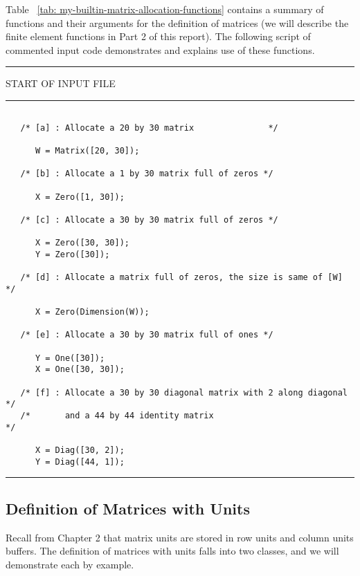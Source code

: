 \vspace{0.15 in}
\noindent\hspace{0.50 in}
Table ~\ref{tab: my-builtin-matrix-allocation-functions} contains
a summary of functions and their arguments for the definition of matrices
(we will describe the finite element functions in Part 2 of this report).
The following script of commented input code 
demonstrates and explains use of these functions.

\vspace{0.15 in}
\begin{footnotesize}
\noindent
{\rule{2.3 in}{0.035 in} START OF INPUT FILE \rule{2.3 in}{0.035 in} }
\begin{verbatim}

   /* [a] : Allocate a 20 by 30 matrix               */

      W = Matrix([20, 30]);

   /* [b] : Allocate a 1 by 30 matrix full of zeros */

      X = Zero([1, 30]);

   /* [c] : Allocate a 30 by 30 matrix full of zeros */

      X = Zero([30, 30]);
      Y = Zero([30]);

   /* [d] : Allocate a matrix full of zeros, the size is same of [W] */

      X = Zero(Dimension(W));

   /* [e] : Allocate a 30 by 30 matrix full of ones */

      Y = One([30]);
      X = One([30, 30]);

   /* [f] : Allocate a 30 by 30 diagonal matrix with 2 along diagonal     */
   /*       and a 44 by 44 identity matrix                                */

      X = Diag([30, 2]);
      Y = Diag([44, 1]);
\end{verbatim}
\rule{6.25 in}{0.035 in}
\end{footnotesize}

\subsection{Definition of Matrices with Units}

\vspace{0.15 in}
\noindent\hspace{0.50 in}
Recall from Chapter 2 that matrix units are
stored in row units and column units buffers.
The definition of matrices with units falls into two classes,
and we will demonstrate each by example.

